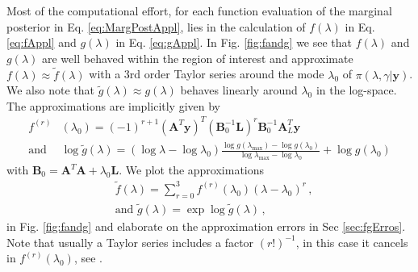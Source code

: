 Most of the computational effort, for each function evaluation of the marginal posterior in Eq. \ref{eq:MargPostAppl}, lies in the calculation of $f(\lambda)$ in Eq. \ref{eq:fAppl} and $g(\lambda)$ in Eq. \ref{eq:gAppl}.
In  Fig. \ref{fig:fandg} we see that $f(\lambda)$ and $g(\lambda)$ are well behaved within the region of interest and approximate $f(\lambda) \approx \tilde{f}(\lambda)$ with a 3rd order Taylor series around the mode $\lambda_0$ of $\pi(\lambda, \gamma | \bm{y})$.
We also note that $\tilde{g}(\lambda) \approx g(\lambda)$ behaves linearly around $\lambda_0$ in the log-space.
The approximations are implicitly given by
\begin{align}
	f^{(r)}& (\lambda_0)= (-1)^{r+1} (\bm{A}^T \bm{y})^T (\bm{B}_0^{-1} \bm{L})^r \bm{B}_0^{-1} \bm{A}_L^T \bm{y} \label{eq:ftay}  \\
	\text{and } & \log{ \tilde{g}(\lambda)} = (\log{\lambda} - \log{\lambda_{0}})  \frac{ \log{g(\lambda_{\text{max}})} - \log{g(\lambda_{0})} }{\log{\lambda_{\text{max}}} - \log{\lambda_{0}} } + \log{ g(\lambda_{0})} 
	\label{eq:gtay}
\end{align} 
with $\bm{B}_0 = \bm{A}^T  \bm{A} + \lambda_0 \bm{L}$.
We plot the approximations
\begin{subequations}
	\label{eq:fandg}
	\begin{align}
		&\tilde{f} ( \lambda) = \sum^3_{r=0} 	f^{(r)}(\lambda_0) (\lambda-\lambda_0)^r  \label{eq:fAprox} \, ,  \\
		&\text{and } \tilde{g} (\lambda) = \exp \log{\tilde{g}(\lambda)}  \label{eq:gAprox} \, ,
	\end{align}
\end{subequations} in Fig. \ref{fig:fandg} and elaborate on the approximation errors in Sec \ref{sec:fgErros}.
Note that usually a Taylor series includes a factor $(r!)^{-1}$, in this case it cancels in $f^{(r)}(\lambda_0)$, see \cite{fox2016fast}.

